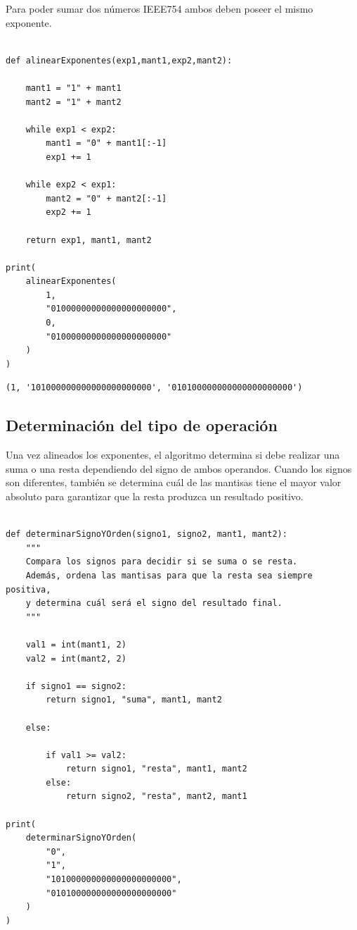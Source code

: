 \documentclass[11pt]{article}
\begin{document}
Para poder sumar dos números IEEE754 ambos deben poseer el mismo
exponente.

\begin{verbatim}

def alinearExponentes(exp1,mant1,exp2,mant2):

    mant1 = "1" + mant1
    mant2 = "1" + mant2

    while exp1 < exp2:
        mant1 = "0" + mant1[:-1]
        exp1 += 1

    while exp2 < exp1:
        mant2 = "0" + mant2[:-1]
        exp2 += 1

    return exp1, mant1, mant2

print(
    alinearExponentes(
        1,
        "01000000000000000000000",
        0,
        "01000000000000000000000"
    )
)
\end{verbatim}

\begin{verbatim}
(1, '101000000000000000000000', '010100000000000000000000')
\end{verbatim}

\subsection{Determinación del tipo de operación}
\label{sec:orgf4625db}

Una vez alineados los exponentes, el algoritmo determina si debe
realizar una suma o una resta dependiendo del signo de ambos
operandos. Cuando los signos son diferentes, también se determina
cuál de las mantisas tiene el mayor valor absoluto para garantizar
que la resta produzca un resultado positivo.

\begin{verbatim}

def determinarSignoYOrden(signo1, signo2, mant1, mant2):
    """
    Compara los signos para decidir si se suma o se resta.
    Además, ordena las mantisas para que la resta sea siempre positiva,
    y determina cuál será el signo del resultado final.
    """

    val1 = int(mant1, 2)
    val2 = int(mant2, 2)

    if signo1 == signo2:
        return signo1, "suma", mant1, mant2

    else:

        if val1 >= val2:
            return signo1, "resta", mant1, mant2
        else:
            return signo2, "resta", mant2, mant1

print(
    determinarSignoYOrden(
        "0",
        "1",
        "101000000000000000000000",
        "010100000000000000000000"
    )
)

\end{verbatim}
\end{document}
